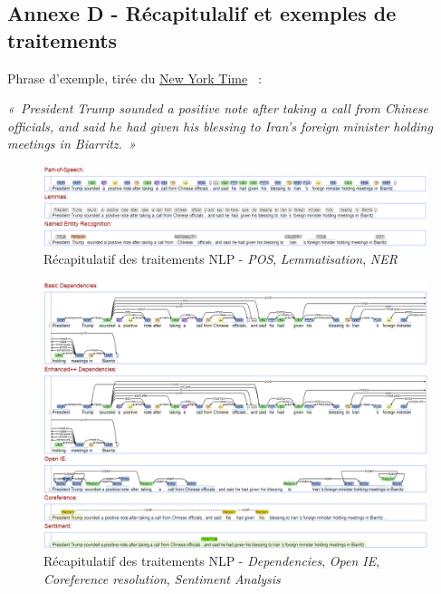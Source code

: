 \subsection*{Annexe D - Récapitulalif et exemples de traitements}

Phrase d'exemple, tirée du \href{https://www.nytimes.com/2019/08/26/world/europe/g7-live-updates.html?action=click&module=Top\%20Stories&pgtype=Homepage}{New York Time} \cite{sent-ex}~:

\textit{«~President Trump sounded a positive note after taking a call from Chinese officials, and said he had given his blessing to Iran’s foreign minister holding meetings in Biarritz.~»}

\begin{figure}[H]
    \centering
    \includegraphics[scale=0.50]{images/nlp-recap-1.png}
    \caption{Récapitulatif des traitements NLP - \textit{POS}, \textit{Lemmatisation}, \textit{NER}}
    \label{fig:nlp-recap-1}
\end{figure}

\begin{figure}[H]
    \centering
    \includegraphics[scale=0.50]{images/nlp-recap-2.png}
    \caption{Récapitulatif des traitements NLP - \textit{Dependencies}, \textit{Open IE}, \textit{Coreference resolution}, \textit{Sentiment Analysis}}
    \label{fig:my_label}
\end{figure}

